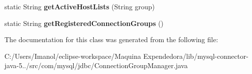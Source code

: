 \begin{DoxyCompactItemize}
\item 
\mbox{\label{classcom_1_1mysql_1_1jdbc_1_1_connection_group_manager_a161858971d3854a6a5bfbdf3e3efb006}} 
static String {\bfseries get\+Active\+Host\+Lists} (String group)
\item 
\mbox{\label{classcom_1_1mysql_1_1jdbc_1_1_connection_group_manager_a310427e264425eb74f2946fca297dcae}} 
static String {\bfseries get\+Registered\+Connection\+Groups} ()
\end{DoxyCompactItemize}


The documentation for this class was generated from the following file\+:\begin{DoxyCompactItemize}
\item 
C\+:/\+Users/\+Imanol/eclipse-\/workspace/\+Maquina Expendedora/lib/mysql-\/connector-\/java-\/5../src/com/mysql/jdbc/Connection\+Group\+Manager.\+java\end{DoxyCompactItemize}

